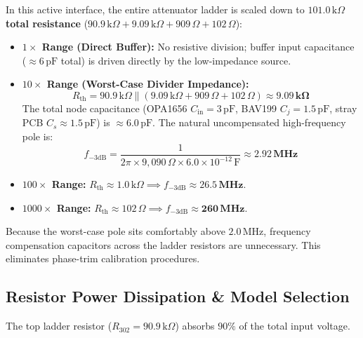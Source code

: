 \documentclass[11pt, letterpaper]{article}
\begin{document}
In this active interface, the entire attenuator ladder is scaled down to \textbf{$101.0\,\text{k}\Omega$ total resistance} ($90.9\,\text{k}\Omega + 9.09\,\text{k}\Omega + 909\,\Omega + 102\,\Omega$):
\begin{itemize}[leftmargin=1.5em]
    \item \textbf{$1\times$ Range (Direct Buffer):} No resistive division; buffer input capacitance ($\approx 6\,\text{pF}$ total) is driven directly by the low-impedance source.
    \item \textbf{$10\times$ Range (Worst-Case Divider Impedance):}
    \begin{equation}
        R_{\text{th}} = 90.9\,\text{k}\Omega \parallel (9.09\,\text{k}\Omega + 909\,\Omega + 102\,\Omega) \approx \mathbf{9.09\,\text{k}\Omega}
    \end{equation}
    The total node capacitance (OPA1656 $C_{\text{in}} = 3\,\text{pF}$, BAV199 $C_j = 1.5\,\text{pF}$, stray PCB $C_s \approx 1.5\,\text{pF}$) is $\approx 6.0\,\text{pF}$. The natural uncompensated high-frequency pole is:
    \begin{equation}
        f_{-3\text{dB}} = \frac{1}{2 \pi \times 9{,}090\,\Omega \times 6.0 \times 10^{-12}\,\text{F}} \approx \mathbf{2.92\,\text{MHz}}
    \end{equation}
    \item \textbf{$100\times$ Range:} $R_{\text{th}} \approx 1.0\,\text{k}\Omega \implies f_{-3\text{dB}} \approx \mathbf{26.5\,\text{MHz}}$.
    \item \textbf{$1000\times$ Range:} $R_{\text{th}} \approx 102\,\Omega \implies f_{-3\text{dB}} \approx \mathbf{260\,\text{MHz}}$.
\end{itemize}
Because the worst-case pole sits comfortably above $2.0\,\text{MHz}$, frequency compensation capacitors across the ladder resistors are unnecessary. This eliminates phase-trim calibration procedures.

\subsection{Resistor Power Dissipation \& Model Selection}
The top ladder resistor ($R_{302} = 90.9\,\text{k}\Omega$) absorbs $90\%$ of the total input voltage.
\end{document}
